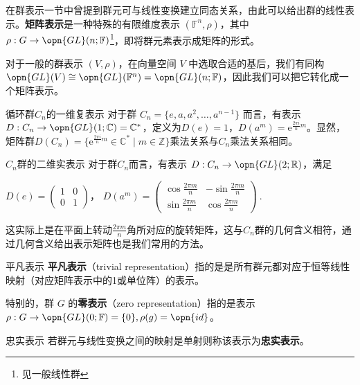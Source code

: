 

在群表示一节中曾提到群元可与线性变换建立同态关系，由此可以给出群的线性表示。\textbf{矩阵表示}是一种特殊的有限维度表示 $(\mathbb{F}^n, \rho)$，其中 $\rho: G \to \opn{GL}(n; \mathbb{F})$\footnote{见一般线性群}，即将群元素表示成矩阵的形式。

对于一般的群表示 $(V, \rho)$，在向量空间 $V$ 中选取合适的基后，我们有同构 $\opn{GL}(V) \cong \opn{GL}(\mathbb{F}^n) = \opn{GL}(n; \mathbb{F})$，因此我们可以把它转化成一个矩阵表示。

\begin{example}{循环群$C_n$的一维复表示}\label{ex_gprep_1}
对于群 $C_n = \{e, a, a^2, \dots, a^{n - 1}\}$ 而言，有表示 $D: C_n \to \opn{GL}(1; \mathbb{C}) = \mathbb{C}^*$，定义为$D(e)=1$，$D(a^m) = \mathrm{e}^{\frac{2\pi i}{n}m}$。显然，矩阵群$D(C_n) = \{\mathrm{e}^{\frac{2\pi i}{n}m} \in \mathbb{C}^* \mid m \in \mathbb{Z}\}$乘法关系与$C_n$乘法关系相同。
\end{example}

\begin{example}{$C_n$群的二维实表示}\label{ex_gprep_2}
对于群$C_n$而言，有表示 $D: C_n \to \opn{GL}(2; \mathbb{R})$，满足

$D(e)=\begin{pmatrix}
 1 & 0 \\
 0 & 1
\end{pmatrix}$，
$D(a^m)=\begin{pmatrix}
 \cos{\frac{2\pi m}{n}} & -\sin{\frac{2\pi m}{n}}\\
 \sin{\frac{2\pi m}{n}} &\cos{\frac{2\pi m}{n}}
\end{pmatrix}~.$

这实际上是在平面上转动$\frac{2\pi m}{n}$角所对应的旋转矩阵，这与$C_n$群的几何含义相符，通过几何含义给出表示矩阵也是我们常用的方法。
\end{example}

\begin{definition}{平凡表示}
\textbf{平凡表示}（trivial representation）指的是是所有群元都对应于恒等线性映射（对应矩阵表示中的1或单位阵）的表示。

特别的，群 $G$ 的\textbf{零表示}（zero representation）指的是表示 $\rho: G \to \opn{GL}(0; \mathbb{F}) = \{0\}, \rho(g) = \opn{id}$。
\end{definition}

\begin{definition}{忠实表示}
若群元与线性变换之间的映射是单射则称该表示为\textbf{忠实表示}。
\end{definition}


